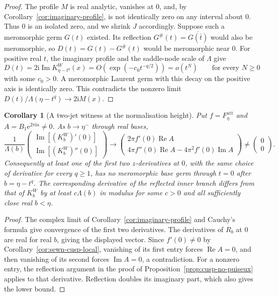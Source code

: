 \documentclass[11pt,a4paper]{article}
\newtheorem{corollary}[theorem]{Corollary}
\theoremstyle{definition}
\newcommand{\Rr}{R}
\newcommand{\Kk}{K}
\newcommand{\eee}{\mathrm{e}}
\newcommand{\ii}{\mathrm{i}}
\begin{document}
\begin{proof}
The profile $M$ is real analytic, vanishes at $0$, and, by
Corollary~\ref{cor:imaginary-profile}, is not identically zero on any
interval about $0$.  Thus $0$ is an isolated zero, and we shrink $J$
accordingly.
Suppose such a meromorphic germ $G(t)$ existed.  Its reflection
$G^\#(t)=\overline{G(\bar t)}$ would also be meromorphic, so
$D(t)=G(t)-G^\#(t)$ would be meromorphic near $0$.
For positive real $t$, the imaginary profile and the saddle-node
scale of $\Lambda$ give
\[
 D(t)=2\ii\operatorname{Im}\Kk^W_{\eta-t^q}(x)
 =O\!\left(\exp(-c_0t^{-q/2})\right)=o(t^N)
 \qquad\text{for every }N\ge0
\]
with some $c_0>0$.  A meromorphic Laurent germ with this decay on the
positive axis is identically zero.  This contradicts the nonzero
limit $D(t)/\Lambda(\eta-t^q)\to2\ii M(x)$.
\end{proof}

\begin{corollary}[A two-jet witness at the normalisation height]
\label{cor:cusp-two-jet}
Put $f=F_\eta^{\mathrm{att}}$ and $A=B_1\eee^{2\pi\ii a}\ne0$.
As $b\to\eta^-$ through real bases,
\[
 \frac{1}{\Lambda(b)}
 \begin{pmatrix}
   \operatorname{Im}[(\Kk_b^W)'(0)]\\
   \operatorname{Im}[(\Kk_b^W)''(0)]
 \end{pmatrix}
 \longrightarrow
 \begin{pmatrix}
   2\pi f'(0)\operatorname{Re}A\\
   4\pi f''(0)\operatorname{Re}A
     -4\pi^2 f'(0)\operatorname{Im}A
 \end{pmatrix}\ne\begin{pmatrix}0\\0\end{pmatrix}.
\]
Consequently at least one of the first two $z$-derivatives at $0$,
with the same choice of derivative for every $q\ge1$, has no
meromorphic base germ through $t=0$ after $b=\eta-t^q$.
The corresponding derivative of the reflected inner branch differs
from that of $\Kk_b^W$ by at least $c\Lambda(b)$ in modulus for some
$c>0$ and all sufficiently close real $b<\eta$.
\end{corollary}

\begin{proof}
The complex limit of Corollary~\ref{cor:imaginary-profile} and
Cauchy's formula give convergence of the first two derivatives.
The derivatives of $\Rr_b$ at $0$ are real for real $b$, giving the
displayed vector.  Since $f'(0)\ne0$ by
Corollary~\ref{cor:sewn-cusp-local}, vanishing of its first entry
forces $\operatorname{Re}A=0$, and then vanishing of its second forces
$\operatorname{Im}A=0$, a contradiction.
For a nonzero entry, the reflection argument in the proof of
Proposition~\ref{prop:cusp-no-puiseux} applies to that derivative.
Reflection doubles its imaginary part, which also gives the lower bound.
\end{proof}
\end{document}
